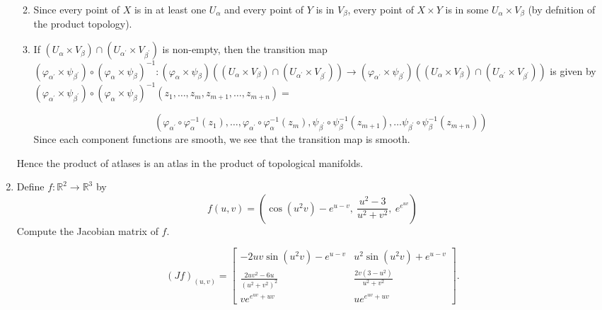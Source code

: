 \documentclass[12pt]{article}
\newcommand{\rl}{\mathbb{R}}
\begin{document}
\begin{enumerate}
\begin{mybox}
\begin{enumerate}
        \vspace*{3mm}
        \item Since every point of $X$ is in
        at least one $U_\alpha$ and every point
        of $Y$ is in $V_\beta$, every point of
        $X\times Y$ is in some $U_\alpha\times
        V_\beta$ (by defnition of the product
        topology).

        \vspace*{3mm}
        \item If $(U_\alpha\times V_\beta)
        \cap (U_{\alpha^\prime}\times V_{\beta
        ^\prime})$ is non-empty,
        then the transition map
        $(\varphi_{\alpha^\prime}
        \times\psi_{\beta^\prime})
        \circ(\varphi_\alpha\times\psi_\beta)
        ^{-1}:(\varphi_\alpha\times\psi_\beta)
        ((U_\alpha\times V_\beta)
        \cap (U_{\alpha^\prime}\times V_{\beta
        ^\prime}))\to 
        (\varphi_{\alpha^\prime}
        \times\psi_{\beta^\prime})
        ((U_\alpha\times V_\beta)
        \cap (U_{\alpha^\prime}\times V_{\beta
        ^\prime}))$ is given by
        $(\varphi_{\alpha^\prime}
        \times\psi_{\beta^\prime})
        \circ(\varphi_\alpha\times\psi_\beta)
        ^{-1}(z_1,\ldots,z_m,z_{m+1},\ldots,
        z_{m+n})=$ 
        
        $$(\varphi_{\alpha^\prime}\circ
        \varphi_\alpha^{-1}(z_1),\ldots,
        \varphi_{\alpha^\prime}\circ
        \varphi_\alpha^{-1}(z_{m}),
        \psi_{\beta^\prime}\circ
        \psi_\beta^{-1}(z_{m+1}),\ldots
        \psi_{\beta^\prime}\circ
        \psi_\beta^{-1}(z_{m+n}))$$
        Since each component functions are smooth,
        we see that the transition map is smooth.
        
    \end{enumerate}
    Hence the product of atlases is an atlas
    in the product of topological manifolds.
\end{mybox}

\item Define $f:\rl^2\to\rl^3$ by
$$f(u,v) =\left(\cos(u^2v)-e^{u-v},\ 
    \frac{u^2-3}{u^2+v^2},\ e^{e^{uv}}\right)$$
Compute the Jacobian matrix of $f$.
        
\begin{mybox}

    $$(Jf)_{(u,v)}=\left[
        \begin{array}{cc}
            -2uv\sin(u^2v)-e^{u-v}
            &u^2\sin(u^2v)+e^{u-v}\\
            \frac{2uv^2-6u}{(u^2+v^2)^2}
            &\frac{2v(3-u^2)}{u^2+v^2}\\
            ve^{e^{uv}+uv}
            &ue^{e^{uv}+uv} 
        \end{array}
    \right].$$
\end{mybox}

\end{enumerate}
\end{document}
